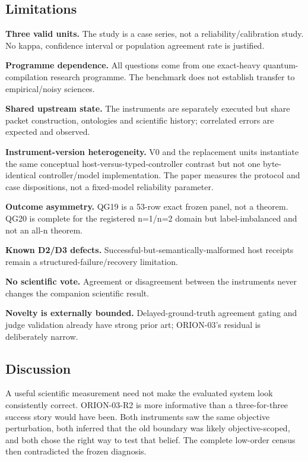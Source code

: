 \documentclass[10pt]{article}
\begin{document}
\hypertarget{limitations}{%
\subsection{Limitations}\label{limitations}}

\textbf{Three valid units.} The study is a case series, not a
reliability/calibration study. No kappa, confidence interval or
population agreement rate is justified.

\textbf{Programme dependence.} All questions come from one exact-heavy
quantum-compilation research programme. The benchmark does not establish
transfer to empirical/noisy sciences.

\textbf{Shared upstream state.} The instruments are separately executed
but share packet construction, ontologies and scientific history;
correlated errors are expected and observed.

\textbf{Instrument-version heterogeneity.} V0 and the replacement units
instantiate the same conceptual host-versus-typed-controller contrast
but not one byte-identical controller/model implementation. The paper
measures the protocol and case dispositions, not a fixed-model
reliability parameter.

\textbf{Outcome asymmetry.} QG19 is a 53-row exact frozen panel, not a
theorem. QG20 is complete for the registered n=1/n=2 domain but
label-imbalanced and not an all-n theorem.

\textbf{Known D2/D3 defects.} Successful-but-semantically-malformed host
receipts remain a structured-failure/recovery limitation.

\textbf{No scientific vote.} Agreement or disagreement between the
instruments never changes the companion scientific result.

\textbf{Novelty is externally bounded.} Delayed-ground-truth agreement
gating and judge validation already have strong prior art; ORION-03's
residual is deliberately narrow.

\hypertarget{discussion}{%
\subsection{Discussion}\label{discussion}}

A useful scientific measurement need not make the evaluated system look
consistently correct. ORION-03-R2 is more informative than a
three-for-three success story would have been. Both instruments saw the
same objective perturbation, both inferred that the old boundary was
likely objective-scoped, and both chose the right way to test that
belief. The complete low-order census then contradicted the frozen
diagnosis.
\end{document}

